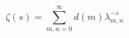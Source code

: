 \begin{equation}
\label{gfunc}
\zeta(s)=\sum_{m,n=0}^\infty d(m) \lambda_{m,n}^{-s}
\end{equation}

